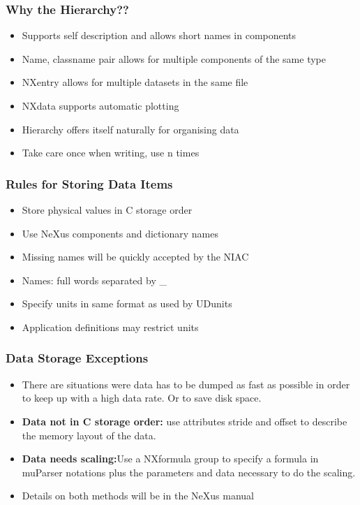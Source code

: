 \documentclass{beamer}
\begin{document}
\begin{frame} \frametitle{Why the Hierarchy??}
\begin{itemize}
\item<1->Supports self description and allows short names in components
\item<2->Name, classname pair allows for multiple components of the same type
\item<3->NXentry allows for multiple datasets in the same file
\item<4->NXdata supports automatic plotting
\item<5->Hierarchy offers itself naturally for organising data
\item<6->Take care once when writing, use n times
\end{itemize}
\end{frame}

\begin{frame}
\frametitle{Rules for Storing Data Items}
\begin{itemize}
\item Store physical values in C storage order
\item Use NeXus components and dictionary names
\item Missing names will be quickly accepted by the NIAC
\item Names: full words separated by \_
\item Specify units in same format as used by UDunits
\item Application definitions may restrict units
\end{itemize}
\end{frame}

\begin{frame}
\frametitle{Data Storage Exceptions}
\begin{itemize}
\item There are situations were data has to be dumped as fast as possible in order to 
 keep up with a high data rate. Or to save disk space.
\item {\bf Data not in C storage order:} use attributes stride and offset to describe the 
 memory layout of the data.
\item {\bf Data needs scaling:}Use a NXformula group to specify a formula in muParser 
 notations plus the parameters and data necessary to do the scaling.
\item Details on both methods will be in the NeXus manual  
\end{itemize}
\end{frame}
\end{document}
